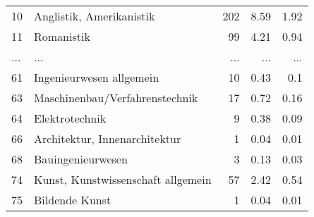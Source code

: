 \begin{longtable}{lXrrr}
        10 & \multicolumn{1}{X}{Anglistik, Amerikanistik} & %
          \num{202} &
          \num[round-mode=places,round-precision=2]{8,59} &
          \num[round-mode=places,round-precision=2]{1,92} \\
        11 & \multicolumn{1}{X}{Romanistik} & %
          \num{99} &
          \num[round-mode=places,round-precision=2]{4,21} &
          \num[round-mode=places,round-precision=2]{0,94} \\
       ... & ... & ... & ... & ... \\
        61 & \multicolumn{1}{X}{Ingenieurwesen allgemein} & %
          \num{10} &
          \num[round-mode=places,round-precision=2]{0,43} &
          \num[round-mode=places,round-precision=2]{0,1} \\

        63 & \multicolumn{1}{X}{Maschinenbau/Verfahrenstechnik} & %
          \num{17} &
          \num[round-mode=places,round-precision=2]{0,72} &
          \num[round-mode=places,round-precision=2]{0,16} \\

        64 & \multicolumn{1}{X}{Elektrotechnik} & %
          \num{9} &
          \num[round-mode=places,round-precision=2]{0,38} &
          \num[round-mode=places,round-precision=2]{0,09} \\

        66 & \multicolumn{1}{X}{Architektur, Innenarchitektur} & %
          \num{1} &
          \num[round-mode=places,round-precision=2]{0,04} &
          \num[round-mode=places,round-precision=2]{0,01} \\

        68 & \multicolumn{1}{X}{Bauingenieurwesen} & %
          \num{3} &
          \num[round-mode=places,round-precision=2]{0,13} &
          \num[round-mode=places,round-precision=2]{0,03} \\

        74 & \multicolumn{1}{X}{Kunst, Kunstwissenschaft allgemein} & %
          \num{57} &
          \num[round-mode=places,round-precision=2]{2,42} &
          \num[round-mode=places,round-precision=2]{0,54} \\

        75 & \multicolumn{1}{X}{Bildende Kunst} & %
          \num{1} &
          \num[round-mode=places,round-precision=2]{0,04} &
          \num[round-mode=places,round-precision=2]{0,01} \\


\end{longtable}
